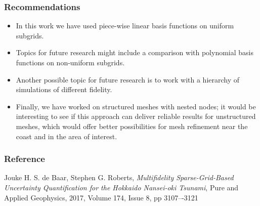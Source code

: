 \documentclass[11pt,ucs]{beamer}
\begin{document}
\begin{frame}\frametitle{Recommendations}

\begin{itemize}


\item %
In this work we have used piece-wise linear basis functions on uniform subgrids. 

\item Topics for future research might include a comparison with polynomial basis functions on non-uniform subgrids. 


\item Another possible topic for future research is to work with a hierarchy of simulations of different fidelity. 

\item Finally, we have worked on structured meshes with nested nodes; it would be interesting to see if this approach can deliver reliable results for unstructured meshes, which would offer better possibilities for mesh refinement near the coast and in the area of interest.

\end{itemize}

\end{frame}




\begin{frame}\frametitle{Reference}

Jouke H. S. de Baar, Stephen G. Roberts, \textit{Multifidelity Sparse-Grid-Based Uncertainty Quantification for the Hokkaido Nansei-oki Tsunami},
Pure and Applied Geophysics, 2017, Volume 174, Issue 8, pp 3107–-3121

\end{frame}



\end{document}
